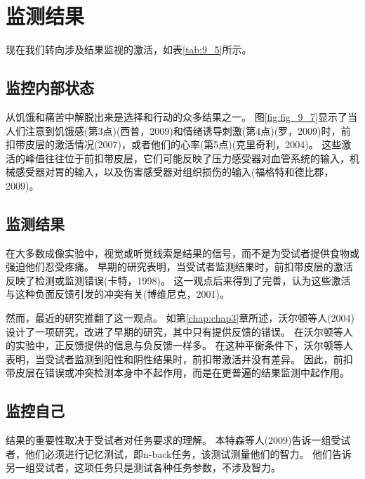 \section{监测结果}
\par
现在我们转向涉及结果监视的激活，如表\ref{tab:9_5}所示。


\subsection{监控内部状态}
\par

从饥饿和痛苦中解脱出来是选择和行动的众多结果之一。
图\ref{fig:fig_9_7}显示了当人们注意到饥饿感(第3点)(西普，2009)和情绪诱导刺激(第4点)(罗，2009)时，前扣带皮层的激活情况(2007)，或者他们的心率(第5点)(克里奇利，2004)。
这些激活的峰值往往位于前扣带皮层，它们可能反映了压力感受器对血管系统的输入，机械感受器对胃的输入，以及伤害感受器对组织损伤的输入(福格特和德比郡，2009)。
\par



\subsection{监测结果}
\par
在大多数成像实验中，视觉或听觉线索是结果的信号，而不是为受试者提供食物或强迫他们忍受疼痛。
早期的研究表明，当受试者监测结果时，前扣带皮层的激活反映了检测或监测错误(卡特，1998)。
这一观点后来得到了完善，认为这些激活与这种负面反馈引发的冲突有关(博维尼克，2001)。
\par


然而，最近的研究推翻了这一观点。
如第\ref{chap:chap3}章所述，沃尔顿等人(2004)设计了一项研究，改进了早期的研究，其中只有提供反馈的错误。
在沃尔顿等人的实验中，正反馈提供的信息与负反馈一样多。
在这种平衡条件下，沃尔顿等人表明，当受试者监测到阳性和阴性结果时，前扣带激活并没有差异。
因此，前扣带皮层在错误或冲突检测本身中不起作用，而是在更普遍的结果监测中起作用。
\par



\subsection{监控自己}
\par
结果的重要性取决于受试者对任务要求的理解。
本特森等人(2009)告诉一组受试者，他们必须进行记忆测试，即n-back任务，该测试测量他们的智力。
他们告诉另一组受试者，这项任务只是测试各种任务参数，不涉及智力。
\par


